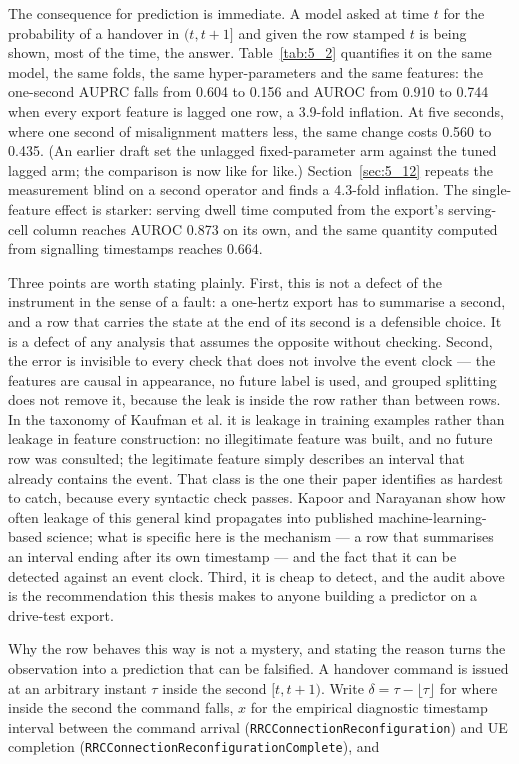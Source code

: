 The consequence for prediction is immediate. A model asked at time $t$ for the probability of a handover in $(t, t+1]$ and given the row stamped $t$ is being shown, most of the time, the answer. Table~\ref{tab:5_2} quantifies it on the same model, the same folds, the same hyper-parameters and the same features: the one-second AUPRC falls from 0.604 to 0.156 and AUROC from 0.910 to 0.744 when every export feature is lagged one row, a 3.9-fold inflation. At five seconds, where one second of misalignment matters less, the same change costs 0.560 to 0.435. (An earlier draft set the unlagged fixed-parameter arm against the tuned lagged arm; the comparison is now like for like.) Section~\ref{sec:5_12} repeats the measurement blind on a second operator and finds a 4.3-fold inflation. The single-feature effect is starker: serving dwell time computed from the export's serving-cell column reaches AUROC 0.873 on its own, and the same quantity computed from signalling timestamps reaches 0.664.

Three points are worth stating plainly. First, this is not a defect of the instrument in the sense of a fault: a one-hertz export has to summarise a second, and a row that carries the state at the end of its second is a defensible choice. It is a defect of any analysis that assumes the opposite without checking. Second, the error is invisible to every check that does not involve the event clock --- the features are causal in appearance, no future label is used, and grouped splitting does not remove it, because the leak is inside the row rather than between rows. In the taxonomy of Kaufman et al. \cite{ref36} it is leakage in training examples rather than leakage in feature construction: no illegitimate feature was built, and no future row was consulted; the legitimate feature simply describes an interval that already contains the event. That class is the one their paper identifies as hardest to catch, because every syntactic check passes. Kapoor and Narayanan \cite{ref56} show how often leakage of this general kind propagates into published machine-learning-based science; what is specific here is the mechanism --- a row that summarises an interval ending after its own timestamp --- and the fact that it can be detected against an event clock. Third, it is cheap to detect, and the audit above is the recommendation this thesis makes to anyone building a predictor on a drive-test export.

Why the row behaves this way is not a mystery, and stating the reason turns the observation into a prediction that can be falsified. A handover command is issued at an arbitrary instant $\tau$ inside the second $[t, t+1)$. Write $\delta = \tau - \lfloor\tau\rfloor$ for where inside the second the command falls, $x$ for the empirical diagnostic timestamp interval between the command arrival (\texttt{RRCConnection\-Reconfiguration}) and UE completion (\texttt{RRCConnection\-Reconfiguration\-Complete}), and


